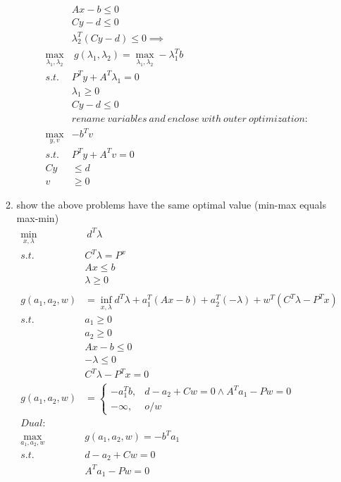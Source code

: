\documentclass[12pt,letter]{article}
\begin{document}
\begin{enumerate}
\begin{enumerate}
\begin{align*}
      &Ax-b \leq 0\\
      &Cy-d \leq 0\\
      &\lambda_2^T(Cy-d)  \leq 0 \implies\\
      \max_{\lambda_1,\lambda_2} & \ g(\lambda_1,\lambda_2) = \max_{\lambda_1,\lambda_2} -\lambda_1^Tb\\
      s.t.\ & P^Ty + A^T\lambda_1 = 0\\
      &\lambda_1 \geq 0\\
             &Cy-d \leq 0\\
             &rename\ variables\ and\ enclose\ with\ outer\ optimization:\\
      \max_{y,v} &-b^Tv\\
      s.t.\ &P^T y + A^Tv = 0\\
      Cy &\leq d\\
      v &\geq 0
    \end{align*}
  \item show the above problems have the same optimal value (min-max equals max-min)
    \begin{align*}
      \min_{x,\lambda}&\ d^T \lambda\\
      s.t.\ & C^T\lambda = P^x\\
                       &Ax \leq b\\
                       &\lambda \geq 0\\
      \\
      g(a_1,a_2,w) &= \inf_{x,\lambda} d^T\lambda + a_1^T(Ax-b)+a_2^T(-\lambda) + w^T(C^T\lambda-P^Tx)\\
      s.t.\ &a_1 \geq 0\\
                       &a_2 \geq 0\\
      &Ax-b \leq 0\\
                       &-\lambda \leq 0\\
                       &C^T\lambda - P^Tx = 0\\
      g(a_1,a_2,w) &=
                     \begin{cases}
                       -a_1^Tb , & d-a_2+Cw=0 \wedge A^Ta_1-Pw=0\\
                       -\infty, & o/w
                     \end{cases}\\
      Dual:&\\
      \max_{a_1,a_2,w}\ & g(a_1,a_2,w) = -b^Ta_1\\
      s.t.\ & d-a_2+Cw=0\\
                      &A^Ta_1-Pw=0\\

\end{align*}
\end{enumerate}
\end{enumerate}
\end{document}
